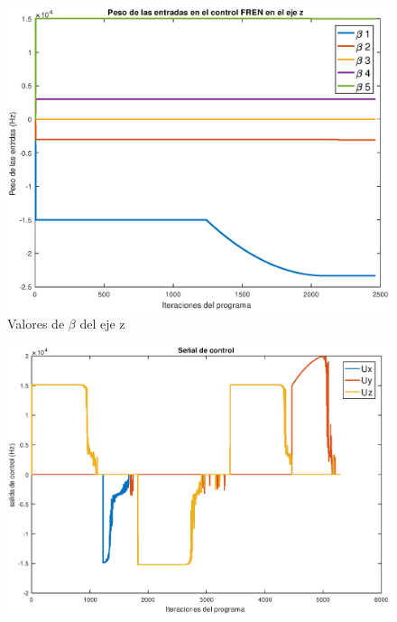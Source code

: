 \begin{figure}
	\centering
	\includegraphics[width=1\linewidth]{visio/graficasderesultados/betasz1}
	\caption{Valores de $\beta$ del eje z}
	\label{fig:betasz1}
\end{figure}
\begin{figure}
	\centering
	\includegraphics[width=1\linewidth]{visio/graficasderesultados/control1}
	\caption{}
	\label{fig:control1}
\end{figure}

